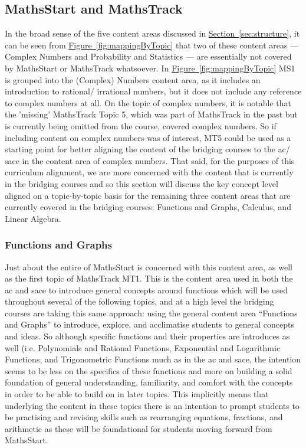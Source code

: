 \documentclass[twoside,12pt,a4paper]{report}
\newcommand{\refsec}[1]{\hyperref[sec:#1]{Section~\ref{sec:#1}}}
\newcommand{\reffig}[1]{\hyperref[fig:#1]{Figure~\ref{fig:#1}}}
\begin{document}
\subsection{MathsStart and MathsTrack}
\label{sec:MSMTmapping}

In the broad sense of the five content areas discussed in \refsec{structure}, it can be seen from \reffig{mappingByTopic} that two of these content areas --- Complex Numbers and Probability and Statistics --- are essentially not covered by MathsStart or MathsTrack whatsoever. In \reffig{mappingByTopic} MS1 is grouped into the (Complex) Numbers content area, as it includes an introduction to rational/ irrational numbers, but it does not include any reference to complex numbers at all. On the topic of complex numbers, it is notable that the 'missing' MathsTrack Topic 5, which was part of MathsTrack in the past but is currently being omitted from the course, covered complex numbers. So if including content on complex numbers was of interest, MT5 could be used as a starting point for better aligning the content of the bridging courses to the \gls{ac}/ \gls{sace} in the content area of complex numbers. That said, for the purposes of this curriculum alignment, we are more concerned with the content that is currently in the bridging courses and so this section will discuss the key concept level aligned on a topic-by-topic basis for the remaining three content areas that are currently covered in the bridging courses: Functions and Graphs, Calculus, and Linear Algebra.

\subsubsection{Functions and Graphs} 

Just about the entire of MathsStart is concerned with this content area, as well as the first topic of MathsTrack MT1. This is the content area used in both the \gls{ac} and \gls{sace} to introduce general concepts around functions which will be used throughout several of the following topics, and at a high level the bridging courses are taking this same approach: using the general content area ``Functions and Graphs'' to introduce, explore, and acclimatise students to general concepts and ideas. So although specific functions and their properties are introduces as well (i.e. Polynomials and Rational Functions, Exponential and Logarithmic Functions, and Trigonometric Functions much as in the \gls{ac} and \gls{sace}, the intention seems to be less on the specifics of these functions and more on building a solid foundation of general understanding, familiarity, and comfort with the concepts in order to be able to build on in later topics. This implicitly means that underlying the content in these topics there is an intention to prompt students to be practising and revising skills such as rearranging equations, fractions, and arithmetic as these will be foundational for students moving forward from MathsStart. 
\end{document}
